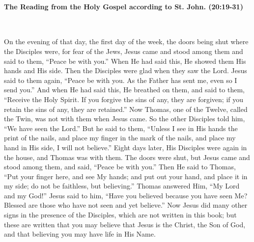 \documentclass[twoside, letterpaper, 12pt]{report}
\begin{document}


\paragraph{The Reading from the Holy Gospel according to St. John. (20:19-31)}\mbox{}\\

\begin{maybetwocolumns}
On the evening of that day, the first day of the week, the doors being shut where the
Disciples were, for fear of the Jews, Jesus came and stood among them and said to them, “Peace
be with you.” When He had said this, He showed them His hands and His side. Then the Disciples
were glad when they saw the Lord. Jesus said to them again, “Peace be with you. As the Father
has sent me, even so I send you.” And when He had said this, He breathed on them, and said to
them, “Receive the Holy Spirit. If you forgive the sins of any, they are forgiven; if you retain the
sins of any, they are retained.” Now Thomas, one of the Twelve, called the Twin, was not with
them when Jesus came. So the other Disciples told him, “We have seen the Lord.” But he said to
them, “Unless I see in His hands the print of the nails, and place my finger in the mark of the nails,
and place my hand in His side, I will not believe.” Eight days later, His Disciples were again in
the house, and Thomas was with them. The doors were shut, but Jesus came and stood among
them, and said, “Peace be with you.” Then He said to Thomas, “Put your finger here, and see My
hands; and put out your hand, and place it in my side; do not be faithless, but believing.” Thomas
answered Him, “My Lord and my God!” Jesus said to him, “Have you believed because you have
seen Me? Blessed are those who have not seen and yet believe.” Now Jesus did many other signs
in the presence of the Disciples, which are not written in this book; but these are written that you
may believe that Jesus is the Christ, the Son of God, and that believing you may have life in His
Name.
\end{maybetwocolumns}
\end{document}
